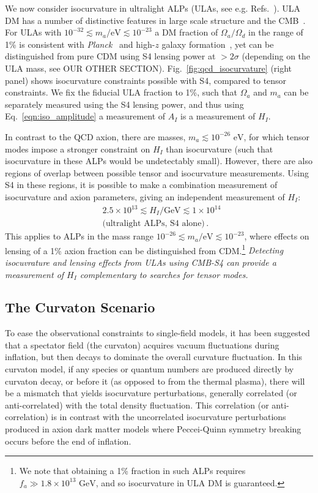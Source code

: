 We now consider isocurvature in ultralight ALPs (ULAs, see e.g. Refs.~\cite{Marsh:2013taa,Marsh:2014qoa}). ULA DM has a number of distinctive features in large scale structure and the CMB~\cite{Hlozek:2014lca,Marsh:2013ywa}. For ULAs with $10^{-32}\lesssim m_a/\text{eV}\lesssim 10^{-23}$ a DM fraction of $\Omega_a/\Omega_d$ in the range of 1\% is consistent with \emph{Planck}~\cite{Hlozek:2014lca} and high-$z$ galaxy formation~\cite{Bozek:2014uqa,Schive:2015kza}, yet can be distinguished from pure CDM using S4 lensing power at $>2\sigma$ (depending on the ULA mass, see OUR OTHER SECTION). Fig.~\ref{fig:qcd_isocurvature} (right panel) shows isocurvature constraints possible with S4, compared to tensor constraints. We fix the fiducial ULA fraction to 1\%, such that $\Omega_a$ and $m_a$ can be separately measured using the S4 lensing power, and thus using Eq.~\ref{eqn:iso_amplitude} a measurement of $A_I$ is a measurement of $H_I$. 

In contrast to the QCD axion, there are masses, $m_a\lesssim 10^{-26}\text{ eV}$, for which tensor modes impose a stronger constraint on $H_I$ than isocurvature (such that isocurvature in these ALPs would be undetectably small). However, there are also regions of overlap between possible tensor and isocurvature measurements. Using S4 in these regions, it is possible to make a combination measurement of isocurvature and axion parameters, giving an independent measurement of $H_I$:
\begin{align}
& 2.5\times 10^{13}\lesssim H_I/\text{GeV}\lesssim 1\times 10^{14}\,  \nonumber \\ 
&\text{(ultralight ALPs, S4 alone)}\,.
\end{align}
This applies to ALPs in the mass range $10^{-26}\lesssim m_a/\text{eV}\lesssim 10^{-23}$, where effects on lensing of a 1\% axion fraction can be distinguished from CDM.\footnote{We note that obtaining a 1\% fraction in such ALPs requires $f_a\gg 1.8\times 10^{13}\text{ GeV}$, and so isocurvature in ULA DM is guaranteed.} \emph{Detecting isocuvrature and lensing effects from ULAs using CMB-S4 can provide a measurement of $H_I$ complementary to searches for tensor modes.}

\subsection{The Curvaton Scenario}

To ease the observational constraints to single-field models, it has been suggested that a spectator field (the curvaton) acquires vacuum fluctuations during inflation, but then decays to dominate the overall curvature fluctuation. In this curvaton model, if any species or quantum numbers are produced directly by curvaton decay, or before it (as opposed to from the thermal plasma), there will be a mismatch that yields isocurvature perturbations, generally correlated (or anti-correlated) with the total density fluctuation. This correlation (or anti-correlation) is in contrast with the uncorrelated isocurvature perturbations produced in axion dark matter models where Peccei-Quinn symmetry breaking occurs before the end of inflation.

